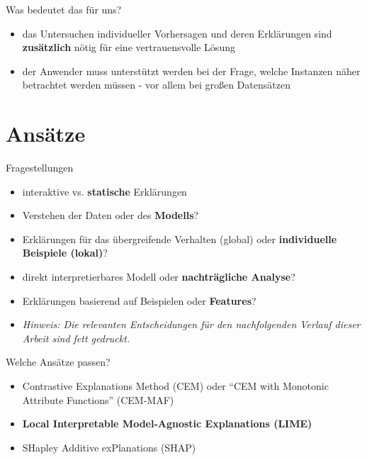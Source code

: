 \documentclass{beamer}
\begin{document}
  \begin{frame}{Was bedeutet das für uns?}
    \begin{itemize}
      \item das Untersuchen individueller Vorhersagen und deren Erklärungen sind \textbf{zusätzlich} nötig für eine vertrauensvolle Lösung
      \item der Anwender muss unterstützt werden bei der Frage, welche Instanzen näher betrachtet werden müssen - vor allem bei großen Datensätzen
    \end{itemize}
  \end{frame}


  \section{Ansätze}

  \begin{frame}{Fragestellungen}
    \begin{itemize}
      \item interaktive vs. \textbf{statische} Erklärungen
      \item Verstehen der Daten oder des \textbf{Modells}?
      \item Erklärungen für das übergreifende Verhalten (global) oder \textbf{individuelle Beispiele (lokal)}?
      \item direkt interpretierbares Modell oder \textbf{nachträgliche Analyse}?
      \item Erklärungen basierend auf Beispielen oder \textbf{Features}?
      \item \textit{Hinweis: Die relevanten Entscheidungen für den nachfolgenden Verlauf dieser Arbeit sind fett gedruckt.}
    \end{itemize}
  \end{frame}

  \begin{frame}{Welche Ansätze passen?}
    \begin{itemize}
      \item Contrastive Explanations Method (CEM) oder "`CEM with Monotonic Attribute Functions"' (CEM-MAF)
      \item \textbf{Local Interpretable Model-Agnostic Explanations\cite{DBLP:journals/corr/RibeiroSG16} (LIME)}
      \item SHapley Additive exPlanations (SHAP)
    \end{itemize}
  \end{frame}
\end{document}
